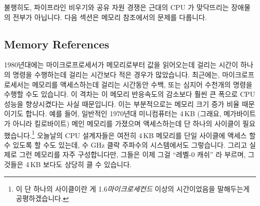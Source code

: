 불행히도, 파이프라인 비우기와 공유 자원 경쟁은 근대의 CPU 가 맞닥뜨리는
장애물의 전부가 아닙니다.
다음 섹션은 메모리 참조에서의 문제를 다룹니다.

\subsection{Memory References}
\label{sec:cpu:Memory References}

1980년대에는 마이크로프로세서가 메모리로부터 값을 읽어오는데 걸리는 시간이
하나의 명령을 수행하는데 걸리는 시간보다 적은 경우가 많았습니다.
최근에는, 마이크로프로세서는 메모리를 액세스하는데 걸리는 시간동안 수백, 또는
심지어 수천개의 명령을 수행할 수도 있습니다.
이 격차는  이 메모리 반응속도의 감소보다 훨씬 큰 폭으로 CPU
성능을 향상시켰다는 사실 때문입니다.
이는 부분적으로는 메모리 크기 증가 비율 때문이기도 합니다.
예를 들어, 일반적인 1970년대 미니컴퓨터는 4\,KB (그래요, 메가바이트가 아니라
킬로바이트) 메인 메모리를 가졌으며 액세스하는데 단 하나의 사이클이
필요했습니다.\footnote{
	이 단 하나의 사이클이란 게 1.6\emph{마이크로세컨드} 이상의 시간이었음을
	말해두는게 공평하겠습니다.}
오늘날의 CPU 설계자들은 여전히 4\,KB 메모리를 단일 사이클에 액세스 할 수 있도록
할 수도 있는데, 수 GHz 클락 주파수의 시스템에서도 그렇습니다.
그리고 실제로 그런 메모리를 자주 구성합니다만, 그들은 이제 그걸 ``레벨-0 캐쉬''
라 부르며, 그것들은 4\,KB 보다도 상당히 클 수 있습니다.

\iffalse

